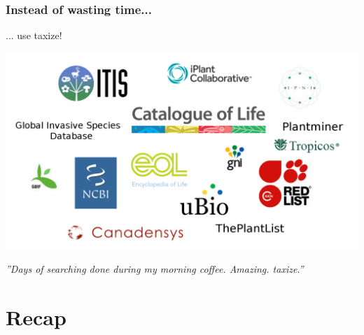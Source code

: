 \documentclass[10pt
	]{beamer}
\begin{document}
{%
\begin{frame}
\frametitle{Instead of wasting time...}
... use \alert{taxize!} \\
	\hspace*{-2cm}
	\begin{center}
	\includegraphics[height=0.6\textheight]{figs/sources_taxize.png}
	\end{center}

\pause
\emph{''Days of searching done during my morning coffee. Amazing. \alert{taxize}.''}
\end{frame}
}



\section*{Recap}
\end{document}
